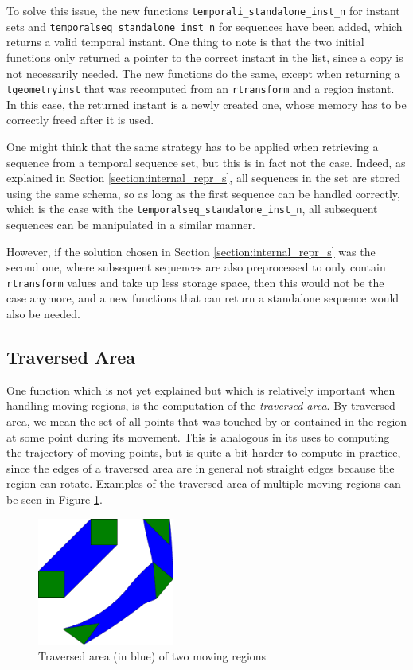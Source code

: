 To solve this issue, the new functions \lstinline{temporali_standalone_inst_n} for instant sets and \lstinline{temporalseq_standalone_inst_n} for sequences have been added, which returns a valid temporal instant. One thing to note is that the two initial functions only returned a pointer to the correct instant in the list, since a copy is not necessarily needed. The new functions do the same, except when returning a \lstinline+tgeometryinst+ that was recomputed from an \lstinline+rtransform+ and a region instant. In this case, the returned instant is a newly created one, whose memory has to be correctly freed after it is used.

One might think that the same strategy has to be applied when retrieving a sequence from a temporal sequence set, but this is in fact not the case. Indeed, as explained in Section \ref{section:internal_repr_s}, all sequences in the set are stored using the same schema, so as long as the first sequence can be handled correctly, which is the case with the \lstinline{temporalseq_standalone_inst_n}, all subsequent sequences can be manipulated in a similar manner.

However, if the solution chosen in Section \ref{section:internal_repr_s} was the second one, where subsequent sequences are also preprocessed to only contain \lstinline+rtransform+ values and take up less storage space, then this would not be the case anymore, and a new functions that can return a standalone sequence would also be needed.

\subsection{Traversed Area}
\label{section:traversed_area}

One function which is not yet explained but which is relatively important when handling moving regions, is the computation of the \textit{traversed area}. By traversed area, we mean the set of all points that was touched by or contained in the region at some point during its movement. This is analogous in its uses to computing the trajectory of moving points, but is quite a bit harder to compute in practice, since the edges of a traversed area are in general not straight edges because the region can rotate. Examples of the traversed area of multiple moving regions can be seen in Figure \ref{fig:traversed_area_examples}.

\begin{figure}[h!]
    \centering
    \includegraphics[width=0.4\textwidth]{images/traversed_area_example.pdf}
    \caption[Traversed area of two moving regions]{Traversed area (in blue) of two moving regions}
    \label{fig:traversed_area_examples}
\end{figure}

